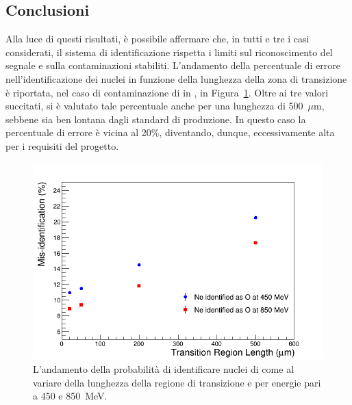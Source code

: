 \subsection*{Conclusioni}


Alla luce di questi risultati, è possibile affermare che, in tutti e tre i casi considerati, il sistema di identificazione rispetta i limiti sul riconoscimento del segnale e sulla contaminazioni stabiliti.
L'andamento della percentuale di errore nell'identificazione dei nuclei in funzione della lunghezza della zona di transizione è riportata, nel caso di contaminazione di  in , in Figura~\ref{fig:misident_vs_length}.
Oltre ai tre valori succitati, si è valutato tale percentuale anche per una lunghezza di 500~$\mu$m, sebbene sia ben lontana dagli standard di produzione.
In questo caso la percentuale di errore è vicina al 20\%, diventando, dunque, eccessivamente alta per i requisiti del progetto.







\begin{figure} [!t]
	\centering
	\includegraphics[width=\textwidth, keepaspectratio]{Grafici_Tesi/Cornice/misident_length2.png}
	\caption{L'andamento della probabilità di identificare nuclei di  come  al variare della lunghezza della regione di transizione e per energie pari a 450 e 850~MeV.} \label{fig:misident_vs_length}
\end{figure}



